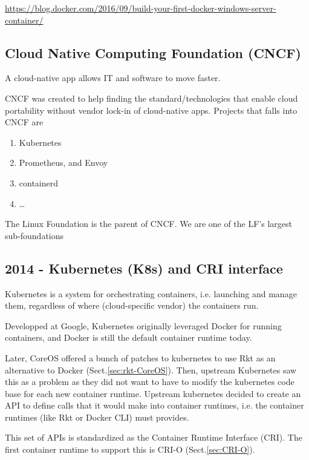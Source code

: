 \url{https://blog.docker.com/2016/09/build-your-first-docker-windows-server-container/}

\subsection{Cloud Native Computing Foundation (CNCF)}
\label{sec:CNCF}

A cloud-native app allows IT and software to move faster. 

CNCF was created to help finding the standard/technologies that enable cloud
portability without vendor lock-in of cloud-native apps. Projects that falls into CNCF are
\begin{enumerate}
  \item Kubernetes
  
  \item Prometheus, and Envoy
  
  \item containerd
  
  \item \ldots
\end{enumerate}


The Linux Foundation is the parent of CNCF. We are one of the LF’s largest sub-foundations


\subsection{2014 - Kubernetes (K8s) and CRI interface}
\label{sec:Kubernetes}
\label{sec:K8s}
\label{sec:CRI-interface}

Kubernetes is a system for orchestrating containers, i.e. launching and manage
them, regardless of where (cloud-specific vendor) the containers run.

Developped at Google, Kubernetes originally leveraged Docker for running
containers, and Docker is still the default container runtime today.

Later, CoreOS offered a bunch of patches to kubernetes to use Rkt as an
alternative to Docker (Sect.\ref{sec:rkt-CoreOS}).
Then, upstream Kubernetes saw this as a problem as they did not want to have to modify
the kubernetes code base for each new container runtime.
Upstream kubernetes decided to create an API to define calls that it would make
into container runtimes, i.e. the container runtimes (like Rkt or Docker CLI) must provides. 

This set of APIs is standardized as the Container Runtime Interface (CRI).
The first container runtime to support this is CRI-O (Sect.\ref{sec:CRI-O}).

